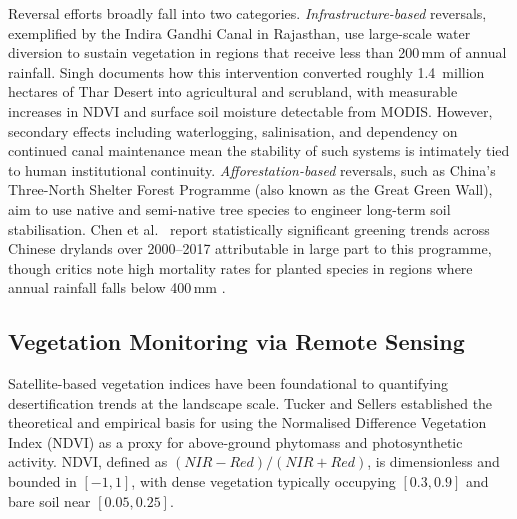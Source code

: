 \documentclass[12pt, a4paper]{article}
\begin{document}

Reversal efforts broadly fall into two categories. \emph{Infrastructure-based} reversals, exemplified by the Indira Gandhi Canal in Rajasthan, use large-scale water diversion to sustain vegetation in regions that receive less than 200\,mm of annual rainfall. Singh \cite{singh2009} documents how this intervention converted roughly 1.4~million hectares of Thar Desert into agricultural and scrubland, with measurable increases in NDVI and surface soil moisture detectable from MODIS. However, secondary effects including waterlogging, salinisation, and dependency on continued canal maintenance mean the stability of such systems is intimately tied to human institutional continuity. \emph{Afforestation-based} reversals, such as China's Three-North Shelter Forest Programme (also known as the Great Green Wall), aim to use native and semi-native tree species to engineer long-term soil stabilisation. Chen et al.\ \cite{chen2019} report statistically significant greening trends across Chinese drylands over 2000--2017 attributable in large part to this programme, though critics note high mortality rates for planted species in regions where annual rainfall falls below 400\,mm \cite{wang2012}.

\subsection{Vegetation Monitoring via Remote Sensing}

Satellite-based vegetation indices have been foundational to quantifying desertification trends at the landscape scale. Tucker and Sellers \cite{tucker1985} established the theoretical and empirical basis for using the Normalised Difference Vegetation Index (NDVI) as a proxy for above-ground phytomass and photosynthetic activity. NDVI, defined as $(NIR - Red)/(NIR + Red)$, is dimensionless and bounded in $[-1, 1]$, with dense vegetation typically occupying $[0.3, 0.9]$ and bare soil near $[0.05, 0.25]$.
\end{document}

